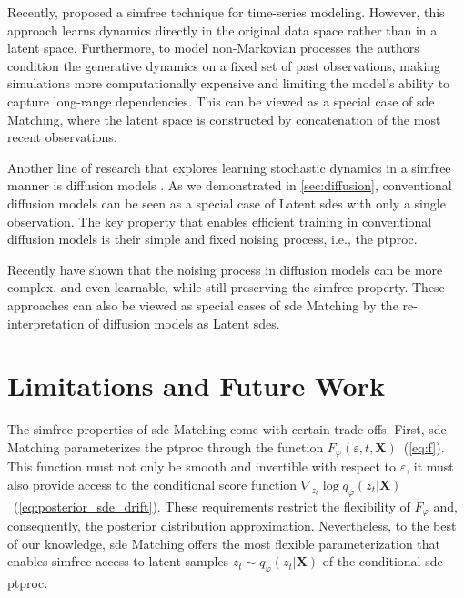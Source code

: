 \documentclass{article}
\def\X{\mathbf{X}}
\def\e{\varepsilon}
\def\ph{\varphi}
\def\n{\nabla}
\theoremstyle{plain}
\theoremstyle{definition}
\theoremstyle{remark}
\begin{document}
Recently, \citet{zhang2024trajectory} proposed a \gls{simfree} technique for time-series modeling. However, this approach learns dynamics directly in the original data space rather than in a latent space. Furthermore, to model non-Markovian processes the authors condition the generative dynamics on a fixed set of past observations, making simulations more computationally expensive and limiting the model's ability to capture long-range dependencies. This can be viewed as a special case of \gls{sde} Matching, where the latent space is constructed by concatenation of the most recent observations.


Another line of research that explores learning stochastic dynamics in a \gls{simfree} manner is diffusion models \cite{ho2020denoising, song2021scorebased}. As we demonstrated in \cref{sec:diffusion}, conventional diffusion models can be seen as a special case of Latent \glspl{sde} with only a single observation. The key property that enables efficient training in conventional diffusion models is their simple and fixed noising process, i.e., the \gls{ptproc}.


Recently \citet{singhal2023where,bartosh2023neural, nielsen2024diffenc, sahoo2024diffusion, bartosh2024neural, du2024doob} have shown that the noising process in diffusion models can be more complex, and even learnable, while still preserving the \gls{simfree} property. These approaches can also be viewed as special cases of \gls{sde} Matching by the re-interpretation of diffusion models as Latent \glspl{sde}.


\section{Limitations and Future Work}
\label{sec:limitations}


The \gls{simfree} properties of \gls{sde} Matching come with certain trade-offs. First, \gls{sde} Matching parameterizes the \gls{ptproc} through the function $F_\ph(\e, t, \X)$~(\cref{eq:f}). This function must not only be smooth and invertible with respect to $\e$, it must also provide access to the conditional score function $\n_{z_t} \log q_\ph(z_t|\X)$~(\cref{eq:posterior_sde_drift}). These requirements restrict the flexibility of $F_\ph$ and, consequently, the posterior distribution approximation. Nevertheless, to the best of our knowledge, \gls{sde} Matching offers the most flexible parameterization that enables \gls{simfree} access to latent samples $z_t \sim q_\ph(z_t|\X)$ of the conditional \gls{sde} \gls{ptproc}.
\end{document}
